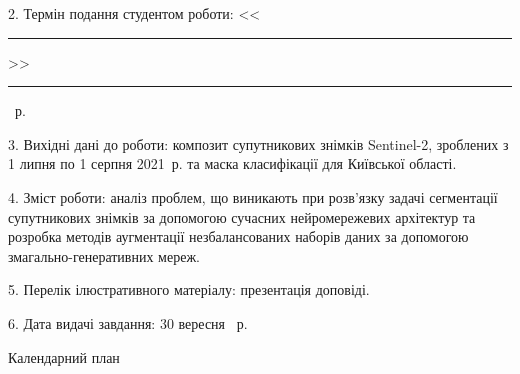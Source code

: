2. Термін подання студентом роботи: <<\rule{0.5cm}{0.25pt}>> \rule{2.5cm}{0.25pt} \YearOfDefence~р.

3. Вихідні дані до роботи: композит супутникових
знімків Sentinel-2, зроблених з
1 липня по 1 серпня 2021~р. та маска
класифікації для Київської області.

4. Зміст роботи: аналіз проблем, що виникають при розв'язку
задачі сегментації супутникових знімків за допомогою сучасних
нейромережевих архітектур та розробка методів аугментації незбалансованих
наборів даних за допомогою змагально-генеративних мереж.

5. Перелік ілюстративного матеріалу: презентація доповіді.

6. Дата видачі завдання: 30 вересня \YearOfBeginning~р.

\newpage
\thispagestyle{empty}

\begin{center}
    Календарний план
\end{center}

